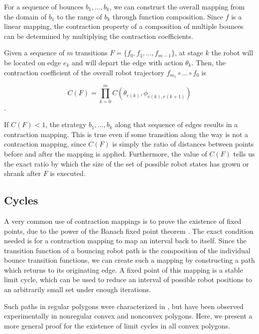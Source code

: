 \documentclass[]{styles/svproc}  %
\begin{document}
For a sequence of bounces $b_1, \ldots, b_k$, we can construct the overall
mapping from the domain of $b_1$ to the range of $b_k$ through function
composition. Since $f$ is a linear mapping, the contraction property of a composition 
of multiple bounces can be determined by multiplying the contraction
coefficients.

\begin{definition}
Given a sequence of $m$ transitions $F = \{f_0, f_1, \ldots, f_{m-1}\}$, at stage $k$ the robot 
will be located on edge $e_k$ and will depart the edge with
action $\theta_k$. Then, the contraction coefficient of the overall robot
trajectory $f_{m_1} \circ \ldots \circ f_0$ is

$$ C(F) = \prod_{k=0}^m C(\theta_{e(k)}, \phi_{e(k), e(k+1)}) $$.
\end{definition}

If $C(F) < 1$, the strategy $b_1, \ldots, b_k$ along that sequence of edges
results in a contraction mapping. This is true even if some transition along
the way is not a
contraction mapping, since $C(F)$ is simply the ratio of distances
between points before and after the mapping is applied. Furthermore, the value
of $C(F)$ tells us the exact ratio by which the
size of the set of possible robot states has grown or shrank after $F$ is
executed.


\subsection{Cycles} \label{sec:cycles}

A very common use of contraction mappings is to prove the existence of fixed
points, due to the power of the Banach fixed point theorem \cite{Granas2003}.
The exact condition needed is for a contraction mapping to map an interval back
to itself. Since the transition function of a bouncing robot path is the
composition of the individual bounce transition functions, we can create such a
mapping by constructing a path which returns to its originating edge. A fixed
point of this mapping is a stable limit cycle, which can be used to reduce an
interval of possible robot positions to an arbitrarily small set under enough
iterations.

Such paths in regular polygons were characterized in \cite{NilBecLav17}, but
have been observed experimentally in nonregular convex and nonconvex polygons.
Here, we present a more general proof for the existence of limit cycles in all
convex polygons.
\end{document}
